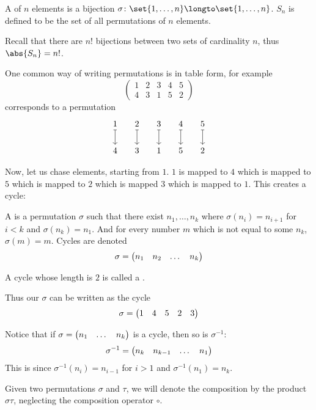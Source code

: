 \begin{defn*}

    A  of $n$ elements is a bijection $\sigma\colon\set{1,\dots,n}\longto\set{1,\dots,n}$.
    $S_n$ is defined to be the set of all permutations of $n$ elements.

\end{defn*}

Recall that there are $n!$ bijections between two sets of cardinality $n$, thus $\abs{S_n}=n!$.

One common way of writing permutations is in table form, for example
\[ \begin{pmatrix} 1 & 2 & 3 & 4 & 5 \\ 4 & 3 & 1 & 5 & 2 \end{pmatrix} \]
corresponds to a permutation
\[ \begin{tikzcd}[column sep=small]
    1 & 2 & 3 & 4 & 5 \\ 4 & 3 & 1 & 5 & 2
    \arrow[maps to, from=1-1, to=2-1]
    \arrow[maps to, from=1-2, to=2-2]
    \arrow[maps to, from=1-3, to=2-3]
    \arrow[maps to, from=1-4, to=2-4]
    \arrow[maps to, from=1-5, to=2-5]
\end{tikzcd} \]

Now, let us chase elements, starting from $1$.
$1$ is mapped to $4$ which is mapped to $5$ which is mapped to $2$ which is mapped $3$ which is mapped to $1$.
This creates a cycle:

\begin{defn*}

    A  is a permutation $\sigma$ such that there exist $n_1,\dots,n_k$ where $\sigma(n_i)=n_{i+1}$ for $i<k$ and $\sigma(n_k)=n_1$.
    And for every number $m$ which is not equal to some $n_k$, $\sigma(m)=m$.
    Cycles are denoted
    \[ \sigma = \begin{pmatrix}n_1 & n_2 & \dots & n_k\end{pmatrix} \]

    A cycle whose length is $2$ is called a .

\end{defn*}

Thus our $\sigma$ can be written as the cycle
\[ \sigma = \begin{pmatrix}1 & 4 & 5 & 2 & 3\end{pmatrix} \]

Notice that if $\sigma=\begin{pmatrix}n_1&\dots&n_k\end{pmatrix}$ is a cycle, then so is $\sigma^{-1}$:
\[ \sigma^{-1} = \begin{pmatrix}n_k&n_{k-1}&\dots&n_1\end{pmatrix} \]
This is since $\sigma^{-1}(n_i)=n_{i-1}$ for $i>1$ and $\sigma^{-1}(n_1)=n_k$.

\begin{note}

    Given two permutations $\sigma$ and $\tau$, we will denote the composition by the product $\sigma\tau$, neglecting the composition operator $\circ$.

\end{note}

